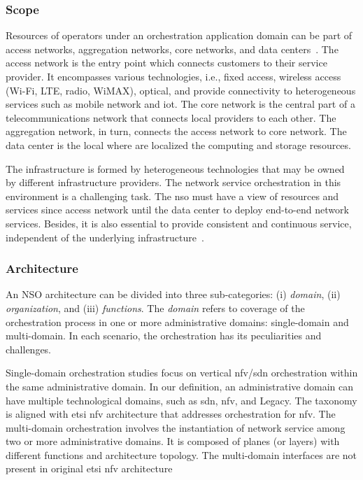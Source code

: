 \subsubsection{Scope}

Resources of operators under an orchestration application domain can be part of access networks, aggregation networks, core networks, and data centers~\cite{5GPPPArchitectureWorkingGroup2016ViewArchitecture}. The access network is the entry point which connects customers to their service provider. It encompasses various technologies, i.e., fixed access, wireless access (Wi-Fi, LTE, radio, WiMAX), optical, and provide connectivity to heterogeneous services such as mobile network and \gls{iot}. The core network is the central part of a telecommunications network that connects local providers to each other. The aggregation network, in turn, connects the access network to core network. The data center is the local where are localized the computing and storage resources.

The infrastructure is formed by heterogeneous technologies that may be owned by different infrastructure providers. The network service orchestration in this environment is a challenging task. The \gls{nso} must have a view of resources and services since access network until the data center to deploy end-to-end network services. Besides, it is also essential to provide consistent and continuous service, independent of the underlying infrastructure~\cite{5GPPPArchitectureWorkingGroup2016ViewArchitecture}. 

\subsubsection{Architecture}
An NSO architecture can be divided into three sub-categories: (i) \textit{domain}, (ii) \textit{organization}, and (iii) \textit{functions}. The \textit{domain} refers to coverage of the orchestration process in one or more administrative domains: single-domain and multi-domain. In each scenario, the orchestration has its peculiarities and challenges.

Single-domain orchestration studies focus on vertical \gls{nfv}/\gls{sdn} orchestration within the same administrative domain. In our definition, an administrative domain can have multiple technological domains, such as \gls{sdn}, \gls{nfv}, and Legacy. The taxonomy is aligned with \gls{etsi} \gls{nfv} architecture that addresses orchestration for \gls{nfv}. The multi-domain orchestration involves the instantiation of network service among two or more administrative domains. It is composed of planes (or layers) with different functions and architecture topology. The multi-domain interfaces are not present in original \gls{etsi} \gls{nfv} architecture

